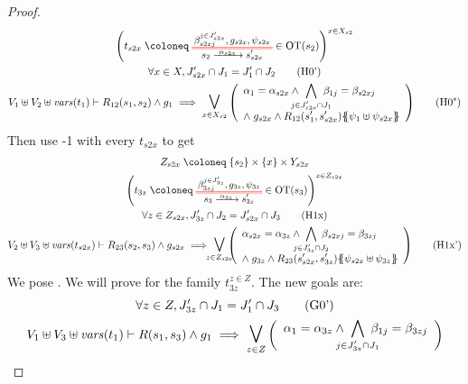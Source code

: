 \documentclass{article}
\begin{document}
\begin{proof}
	\begin{gather*}
		\mpar{t_{s2x} \defobject \OT{s_2}{s'_{s2x}}{\alpha_{s2x}}{\beta_{s2xj}^{j \in J'_{s2x}}}{g_{s2x}}{\psi_{s2x}} \in \fOT{s_2}}^{x \in X_{s2}} \\
		\forall x \in X, J'_{s2x} \cap J_1 = J'_1 \cap J_2 \hyp{0'} \\
		V_1 \uplus V_2 \uplus \fvars{t_1} \vdash R_{12}\mpar{s_1, s_2} \wedge g_1 \implies \operatorname*{\bigsymb{\bigvee}}_{x \in X_{s2}} \mpar{\everymath{\displaystyle}\begin{array}{l}
			\alpha_1 = \alpha_{s2x} \wedge \bigwedge_\subbox{j \in J'_{s2x} \cap J_1} \beta_{1j} = \beta_{s2xj} \\[12pt]
			\nwedge g_{s2x} \wedge R_{12}\mpar{s'_1, s'_{s2x}}\psubst{\psi_1 \uplus \psi_{s2x}}
		\end{array}} \hyp{0"}
	\end{gather*}
	Then use \hyp{1} with every \(t_{s2x}\) to get
	\begin{gather*}
		Z_{s2x} \defobject \mbrc{s_2} \times \mbrc{x} \times Y_{s2x} \\
		\mpar{t_{3z} \defobject \OTx{3}{z}{3z}{3z} \in \fOT{s_3}}^{z \in Z_{s2x}} \\
		\forall z \in Z_{s2x}, J'_{3z} \cap J_2 = J'_{s2x} \cap J_3 \hyp{1x} \\
		V_2 \uplus V_3 \uplus \fvars{t_{s2x}} \vdash R_{23}\mpar{s_2, s_3} \wedge g_{s2x} \implies \operatorname*{\bigsymb{\bigvee}}_\subbox{z \in Z_{s2x}} \mpar{\everymath{\displaystyle}\begin{array}{l}
			\alpha_{s2x} = \alpha_{3z} \wedge \bigwedge_\subbox{j \in J'_{3z} \cap J_2} \beta_{s2xj} = \beta_{3zj} \\[12pt]
			\nwedge g_{3z} \wedge R_{23}\mpar{s'_{s2x}, s'_{3z}}\psubst{\psi_{s2x} \uplus \psi_{3z}}
		\end{array}} \hyp{1x'}
	\end{gather*}
	We pose .
	We will prove  for the family \(t_{3z}^{z \in Z}\).
	The new goals are:
	\begin{gather}
		\forall z \in Z, J'_{3z} \cap J_1 = J'_1 \cap J_3 \goal{0'} \\
		V_1 \uplus V_3 \uplus \fvars{t_1} \vdash R\mpar{s_1, s_3} \wedge g_1 \implies \operatorname*{\bigsymb{\bigvee}}_{z \in Z} \mpar{\everymath{\displaystyle}\begin{array}{l}
			\alpha_1 = \alpha_{3z} \wedge \bigwedge_\subbox{j \in J'_{3z} \cap J_1} \beta_{1j} = \beta_{3zj} \\[12pt]

\end{array}}
\end{gather}
\end{proof}
\end{document}
